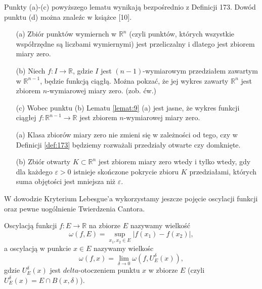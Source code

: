 \documentclass[leqno]{article}
\begin{document}
\begin{justify}
Punkty (a)-(c) powyższego lematu wynikają bezpośrednio z Definicji 173. Dowód punktu (d) można znaleźc w książce [10].

\begin{ex}
    \begin{itemize}
        \item [(a)]
            Zbiór punktów wymiernch w $\mathbb{R}^n$ (czyli punktów, których wszystkie współrzędne są liczbami wymiernymi) jest przeliczalny i dlatego jest zbiorem miary zero.
        \item [(b)]
            Niech $f : I \to \mathbb{R}$, gdzie $I$ jest $(n-1)$-wymiarowym przedziałem zawartym w $\mathbb{R}^{n-1}$, będzie funkcją ciągłą. Można pokzać, 
            że jej wykres zawarty $\mathbb{R}^n$ jest zbiorem $n$-wymiarowej miary zero. (zob. ćw.)
        \item [(c)]
            Wobec punktu (b) Lematu \ref{lemat:9} (a) jest jasne, że wykres funkcji ciągłej $f : \mathbb{R}^{n-1} \to \mathbb{R}$ jest zbiorem $n$-wymiarowej miary zero.
    \end{itemize}
\end{ex}

\begin{lemat}
{
    \begin{itemize}
        \item [(a)]
            Klasa zbiorów miary zero nie zmieni się w zależności od tego, czy w Definicji \ref{def:173} będziemy rozważali przedziały otwarte czy domknięte.
        \item [(b)]
            Zbiór otwarty $K \subset \mathbb{R}^n$ jest zbiorem miary zero wtedy i tylko wtedy, gdy dla każdego $\varepsilon > 0$ istnieje skończone pokrycie 
            zbioru $K$ przedziałami, których suma objętości jest mniejsza niż $\varepsilon$.
    \end{itemize}
}
\end{lemat}

W dowodzie Kryterium Lebesgue'a wykorzystamy jeszcze pojęcie oscylacji funkcji oraz pewne uogólnienie Twierdzenia Cantora.

\begin{defn}
    Oscylacją funkcji $f : E \to \mathbb{R}$ na zbiorze $E$ nazywamy wielkość 
    \[
        \omega(f, E) = \sup_{x_1, x_2 \in E}|f(x_1) - f(x_2)|,
    \]
    a oscylacją w punkcie $x \in E$ nazywamy wielkośc 
    \[
        \omega(f, x) = \lim_{\delta \to 0}\omega(f, U_E^\delta(x)),
    \]
    gdzie $ U_E^\delta(x)$ jest $delta$-otoczeniem punktu $x$ w zbiorze $E$ (czyli $U_E^\delta(x) = E \cap B(x, \delta)$).
\end{defn}


\end{justify}
\end{document}
